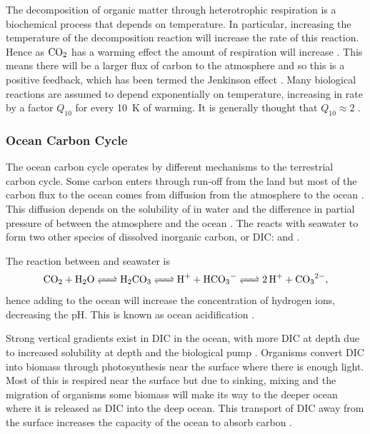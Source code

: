 The decomposition of organic matter through heterotrophic respiration is a biochemical process that depends on temperature. In particular, increasing the temperature of the decomposition reaction
will increase the rate of this reaction. Hence as $\ce{CO2}$ has a warming effect the amount of respiration will increase \parencite{Jenkinson1991}. 
This means there will be a larger flux of carbon to the atmosphere and so this is a positive feedback, which has been termed the Jenkinson effect \parencite{Luke2011}.
Many biological reactions are assumed to depend exponentially on temperature, increasing in rate by a factor $Q_{10}$ for every \SI{10}{\kelvin} of warming.
It is generally thought that $Q_{10} \approx 2$ \parencite{Jones2001}.

\subsubsection{Ocean Carbon Cycle}

The ocean carbon cycle operates by different mechanisms to the terrestrial carbon cycle. Some carbon enters through run-off from the land but most of the carbon flux to the ocean comes
from diffusion from the atmosphere to the ocean \parencite{Devries2022}. This diffusion depends on the solubility of  in water and
the difference in partial pressure of  between the atmosphere and the ocean \parencite{Wanninkhof1992}.
The  reacts with seawater to form two other species of dissolved inorganic carbon, or DIC:\@ {} and  \parencite{Dickson1987}.

The reaction between  and seawater is
\begin{equation}
  \label{eq:dissolving_co2}
  \ce{CO2 + H2O <=> H2CO3 <=> H^+ + HCO3^- <=> 2H^+ + CO3^{2-}},
\end{equation}
hence adding  to the ocean will increase the concentration of hydrogen ions, decreasing the pH. This is known as ocean acidification \parencite{Doney2009}.

Strong vertical gradients exist in DIC in the ocean, with more DIC at depth due to increased solubility at depth and the biological pump \parencite{Volk1985}. Organisms convert DIC into biomass
through photosynthesis near the surface where there is enough light. Most of this is respired near the surface but due to sinking, mixing and the migration of organisms some biomass
will make its way to the deeper ocean where it is released as DIC into the deep ocean. This transport of DIC away from the surface increases the capacity of the ocean to absorb carbon
\parencite{Sarmiento1984}.

